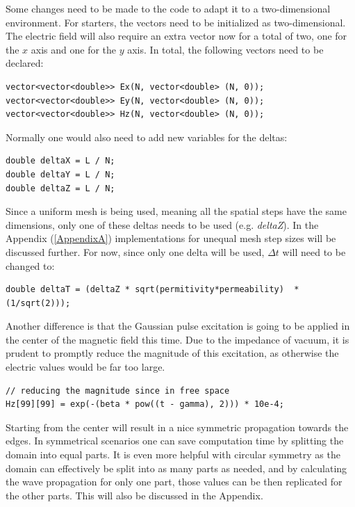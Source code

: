 Some changes need to be made to the code to adapt it to a two-dimensional environment. For starters, the vectors need to be initialized as two-dimensional. The electric field will also require an extra vector now for a total of two, one for the $x$ axis and one for the $y$ axis. In total, the following vectors need to be declared:

\begin{verbatim}
vector<vector<double>> Ex(N, vector<double> (N, 0));
vector<vector<double>> Ey(N, vector<double> (N, 0));
vector<vector<double>> Hz(N, vector<double> (N, 0));
\end{verbatim}

Normally one would also need to add new variables for the deltas:
\begin{verbatim}
double deltaX = L / N;
double deltaY = L / N;
double deltaZ = L / N;
\end{verbatim}

Since a uniform mesh is being used, meaning all the spatial steps have the same dimensions, only one of these deltas needs to be used (e.g. \textit{deltaZ}). In the Appendix (\ref{AppendixA}) implementations for unequal mesh step sizes will be discussed further. For now, since only one delta will be used, $\Delta t$ will need to be changed to:

\begin{verbatim}
double deltaT = (deltaZ * sqrt(permitivity*permeability)  * (1/sqrt(2)));
\end{verbatim}

Another difference is that the Gaussian pulse excitation is going to be applied in the center of the magnetic field this time. Due to the impedance of vacuum, it is prudent to promptly reduce the magnitude of this excitation, as otherwise the electric values would be far too large.

\begin{verbatim}
// reducing the magnitude since in free space
Hz[99][99] = exp(-(beta * pow((t - gamma), 2))) * 10e-4;
\end{verbatim}

Starting from the center will result in a nice symmetric propagation towards the edges. In symmetrical scenarios one can save computation time by splitting the domain into equal parts. It is even more helpful with circular symmetry as the domain can effectively be split into as many parts as needed, and by calculating the wave propagation for only one part, those values can be then replicated for the other parts. This will also be discussed in the Appendix.

